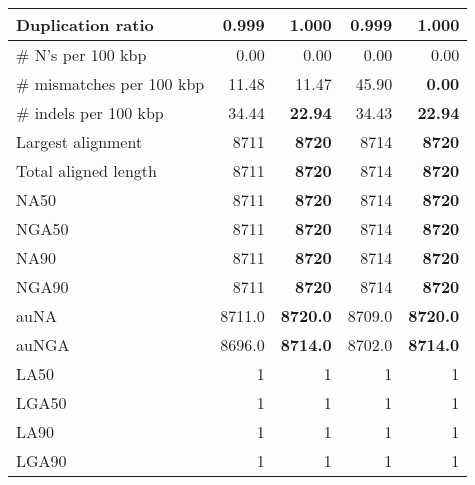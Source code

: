 \documentclass[12pt,a4paper]{article}
\begin{document}
\begin{table}[ht]
\begin{center}
\begin{tabular}{|l*{4}{|r}|}
Duplication ratio & {\bf 0.999} & 1.000 & {\bf 0.999} & 1.000 \\ \hline
\# N's per 100 kbp & 0.00 & 0.00 & 0.00 & 0.00 \\ \hline
\# mismatches per 100 kbp & 11.48 & 11.47 & 45.90 & {\bf 0.00} \\ \hline
\# indels per 100 kbp & 34.44 & {\bf 22.94} & 34.43 & {\bf 22.94} \\ \hline
Largest alignment & 8711 & {\bf 8720} & 8714 & {\bf 8720} \\ \hline
Total aligned length & 8711 & {\bf 8720} & 8714 & {\bf 8720} \\ \hline
NA50 & 8711 & {\bf 8720} & 8714 & {\bf 8720} \\ \hline
NGA50 & 8711 & {\bf 8720} & 8714 & {\bf 8720} \\ \hline
NA90 & 8711 & {\bf 8720} & 8714 & {\bf 8720} \\ \hline
NGA90 & 8711 & {\bf 8720} & 8714 & {\bf 8720} \\ \hline
auNA & 8711.0 & {\bf 8720.0} & 8709.0 & {\bf 8720.0} \\ \hline
auNGA & 8696.0 & {\bf 8714.0} & 8702.0 & {\bf 8714.0} \\ \hline
LA50 & 1 & 1 & 1 & 1 \\ \hline
LGA50 & 1 & 1 & 1 & 1 \\ \hline
LA90 & 1 & 1 & 1 & 1 \\ \hline
LGA90 & 1 & 1 & 1 & 1 \\ \hline
\end{tabular}
\end{center}
\end{table}
\end{document}
